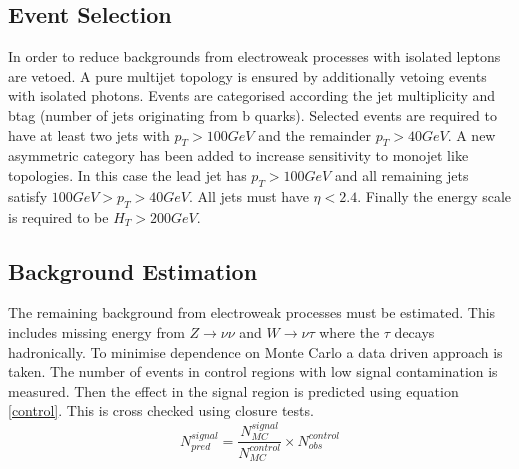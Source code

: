 \subsection{Event Selection}
In order to reduce backgrounds from electroweak processes with isolated leptons are vetoed. A pure multijet topology is ensured by additionally vetoing events with isolated photons. Events are categorised according the jet multiplicity and btag (number of jets originating from b quarks). Selected events are required to have at least two jets with $p_T > 100GeV$ and the remainder $p_T > 40GeV$. A new asymmetric category has been added to increase sensitivity to monojet like topologies. In this case the lead jet has $p_T > 100 GeV$ and all remaining jets satisfy $100 GeV > p_T > 40GeV$. All jets must have $\eta < 2.4$. Finally the energy scale is required to be $H_T > 200 GeV$. 

\subsection{Background Estimation}
The remaining background from electroweak processes must be estimated. This includes missing energy from $Z\rightarrow\nu\nu$ and $W\rightarrow\nu\tau$ where the $\tau$ decays hadronically. To minimise dependence on Monte Carlo a data driven approach is taken. The number of events in control regions with low signal contamination is measured. Then the effect in the signal region is predicted using equation \ref{control}. This is cross checked using closure tests.
\begin{equation}
\label{control}
N_{pred}^{signal}=\frac{N_{MC}^{signal}}{N_{MC}^{control}}\times N^{control}_{obs}
\end{equation} 
